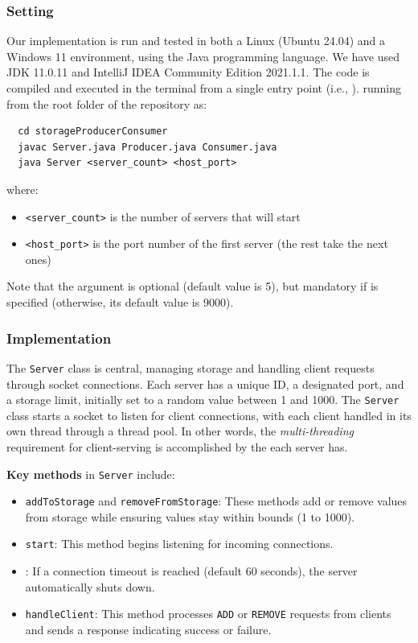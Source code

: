 \documentclass[acmlarge]{acmart}
\begin{document}
\subsubsection{Setting}
Our implementation is run and tested in both a Linux (Ubuntu 24.04) and a Windows 11 environment, using the Java programming language.
We have used JDK 11.0.11 and IntelliJ IDEA Community Edition 2021.1.1.
The code is compiled and executed in the terminal from a single entry point (i.e., ).
running from the root folder of the repository as:
\begin{verbatim}
  cd storageProducerConsumer
  javac Server.java Producer.java Consumer.java
  java Server <server_count> <host_port>
\end{verbatim}
where:
\begin{itemize}
  \item \texttt{<server\_count>} is the number of servers that will start
  \item \texttt{<host\_port>} is the port number of the first server (the rest take the next ones)
\end{itemize}

Note that the  argument is optional (default value is 5), but mandatory if
 is specified (otherwise, its default value is 9000).

\subsubsection{Implementation}
The \texttt{Server} class is central, managing storage and handling client requests through socket connections.
Each server has a unique ID, a designated port, and a storage limit, initially set to a random value between 1 and 1000.
The \texttt{Server} class starts a socket to listen for client connections, with each client handled in its own
thread through a thread pool.
In other words, the \textit{multi-threading} requirement for client-serving is accomplished by the
 each server has.

\textbf{Key methods} in \texttt{Server} include:
\begin{itemize}
  \item \texttt{addToStorage} and \texttt{removeFromStorage}: These methods add or remove values from storage while ensuring values stay within bounds (1 to 1000).
  \item \texttt{start}: This method begins listening for incoming connections.
  \item {}: If a connection timeout is reached (default 60 seconds), the server automatically shuts down.
  \item \texttt{handleClient}: This method processes \texttt{ADD} or \texttt{REMOVE} requests from clients and sends a response indicating success or failure.
\end{itemize}
\end{document}
